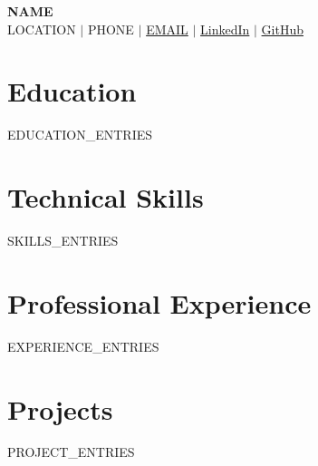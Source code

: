 \documentclass[letterpaper,10pt]{article}
\newcommand{\resumeSubHeadingListStart}{\begin{itemize}[leftmargin=0in, label={}]}
\newcommand{\resumeSubHeadingListEnd}{\end{itemize}}
\newcommand{\resumeItemListStart}{\begin{itemize}[leftmargin=0.15in]}
\newcommand{\resumeItemListEnd}{\end{itemize}\vspace{-5pt}}
\begin{document}
\begin{center}
    {\LARGE \scshape \bfseries {{NAME}} } \\[3pt]
    {{LOCATION}} $\mid$
    {{PHONE}} $\mid$
    \href{mailto:{{EMAIL}}}{{{EMAIL}}} $\mid$
    \href{{{LINKEDIN_URL}}}{LinkedIn} $\mid$
    \href{{{GITHUB_URL}}}{GitHub}
\end{center}

\section{Education}
\resumeSubHeadingListStart
  {{EDUCATION_ENTRIES}}
\resumeSubHeadingListEnd

\section{Technical Skills}
\resumeItemListStart
  {{SKILLS_ENTRIES}}
\resumeItemListEnd

\section{Professional Experience}
\resumeSubHeadingListStart
  {{EXPERIENCE_ENTRIES}}
\resumeSubHeadingListEnd

\section{Projects}
\resumeSubHeadingListStart
  {{PROJECT_ENTRIES}}
\resumeSubHeadingListEnd
\end{document}
